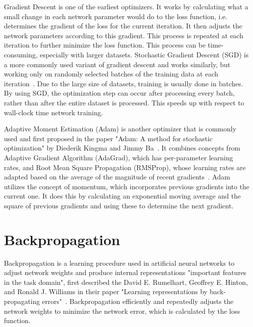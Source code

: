 Gradient Descent is one of the earliest optimizers.
It works by calculating what a small change in each network parameter would do to the loss function, i.e. determines the gradient of the loss for the current iteration.
It then adjusts the network parameters according to this gradient.
This process is repeated at each iteration to further minimize the loss function.
This process can be time-consuming, especially with larger datasets.
Stochastic Gradient Descent (SGD) is a more commonly used variant of gradient descent and works similarly, but working only on randomly selected batches of the training data at each iteration~\cite{optimizer-intro}.
Due to the large size of datasets, training is usually done in batches.
By using SGD, the optimization step can occur after processing every batch, rather than after the entire dataset is processed.
This speeds up with respect to wall-clock time network training.

Adaptive Moment Estimation (Adam) is another optimizer that is commonly used and first proposed in the paper "Adam: A method for stochastic optimization" by Diederik Kingma and Jimmy Ba~\cite{adam}.
It combines concepts from Adaptive Gradient Algorithm (AdaGrad), which has per-parameter learning rates, and Root Mean Square Propagation (RMSProp), whose learning rates are adapted based on the average of the magnitude of recent gradients~\cite{adam}.
Adam utilizes the concept of momentum, which incorporates previous gradients into the current one.
It does this by calculating an exponential moving average and the square of previous gradients and using these to determine the next gradient.

\section{Backpropagation}\label{section:background-backpropagation}
Backpropagation is a learning procedure used in artificial neural networks to adjust network weights and produce internal representations "important features in the task domain", first described the David E. Rumelhart, Geoffrey E. Hinton, and Ronald J. Williams in their paper "Learning representations by back-propagating errors"~\cite{backprop}.
Backpropagation efficiently and repeatedly adjusts the network weights to minimize the network error, which is calculated by the loss function.

